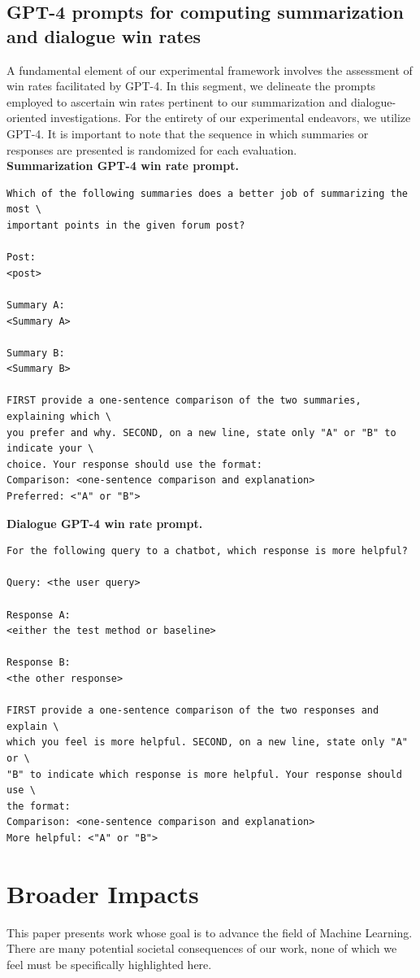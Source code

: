\subsection{GPT-4 prompts for computing summarization and dialogue win rates}
\label{app:prompts}
A fundamental element of our experimental framework involves the assessment of win rates facilitated by GPT-4. In this segment, we delineate the prompts employed to ascertain win rates pertinent to our summarization and dialogue-oriented investigations. For the entirety of our experimental endeavors, we utilize GPT-4. It is important to note that the sequence in which summaries or responses are presented is randomized for each evaluation.
\\[2mm]
\textbf{Summarization GPT-4 win rate prompt.}
\begin{verbatim}
Which of the following summaries does a better job of summarizing the most \
important points in the given forum post?

Post:
<post>

Summary A:
<Summary A>

Summary B:
<Summary B>

FIRST provide a one-sentence comparison of the two summaries, explaining which \
you prefer and why. SECOND, on a new line, state only "A" or "B" to indicate your \ 
choice. Your response should use the format:
Comparison: <one-sentence comparison and explanation>
Preferred: <"A" or "B">
\end{verbatim}

\textbf{Dialogue GPT-4 win rate prompt.}
\begin{verbatim}
For the following query to a chatbot, which response is more helpful?

Query: <the user query>

Response A:
<either the test method or baseline>

Response B:
<the other response>

FIRST provide a one-sentence comparison of the two responses and explain \
which you feel is more helpful. SECOND, on a new line, state only "A" or \
"B" to indicate which response is more helpful. Your response should use \
the format:
Comparison: <one-sentence comparison and explanation>
More helpful: <"A" or "B">
\end{verbatim}

\section{Broader Impacts}
\label{broader_impacts}
This paper presents work whose goal is to advance the field of Machine Learning. There are many potential societal consequences of our work, none of which we feel must be specifically highlighted here.